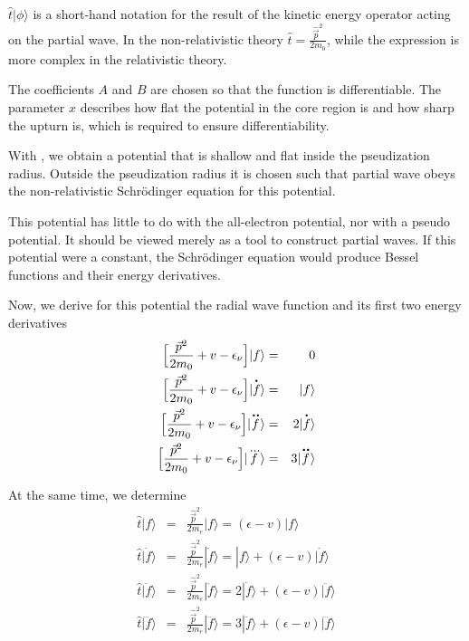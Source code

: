 \documentclass[11pt,a4paper]{report}
\begin{document}
$\hat{t}|\phi\rangle$ is a short-hand notation for the
result of the kinetic energy operator acting on the partial wave. In
the non-relativistic theory $\hat{t}=\frac{\hat{\vec{p}}^2}{2m_0}$,
while the expression is more complex in the relativistic theory.

The coefficients $A$ and $B$
are chosen so that the function is differentiable. The parameter $x$
describes how flat the potential in the core region is and how sharp
the upturn is, which is required to ensure differentiability.

With , we obtain a potential that is shallow and
flat inside the pseudization radius. Outside the pseudization radius
it is chosen such that partial wave obeys the non-relativistic
Schr\"odinger equation for this potential.

This potential has little to do with the all-electron potential,
nor with a pseudo potential. It should be viewed merely as a tool to
construct partial waves. If this potential were a constant, the
Schr\"odinger equation would produce Bessel functions and their
energy derivatives. 

Now, we derive for this potential the radial wave function and its
first two energy derivatives
\begin{eqnarray}
\Bigl[\frac{\vec{p}^2}{2m_0}+v-\epsilon_\nu\Bigr]|f\rangle&=&0
\nonumber\\
\Bigl[\frac{\vec{p}^2}{2m_0}+v-\epsilon_\nu\Bigr]|\dot{f}\rangle&=&|f\rangle
\nonumber\\
\Bigl[\frac{\vec{p}^2}{2m_0}+v-\epsilon_\nu\Bigr]|\ddot{f}\rangle
&=&2|\dot{f}\rangle
\nonumber\\
\Bigl[\frac{\vec{p}^2}{2m_0}+v-\epsilon_\nu\Bigr]|\dddot{f}\rangle
&=&3|\ddot{f}\rangle
\end{eqnarray}

At the same time, we determine 
\begin{eqnarray}
\hat{t}|f\rangle&=&\frac{\hat{\vec{p}}^2}{2m_e}|f\rangle
=(\epsilon-v)|f\rangle
\nonumber\\
\hat{t}|\dot{f}\rangle&=&\frac{\hat{\vec{p}}^2}{2m_e}|\dot{f}\rangle
=|f\rangle+(\epsilon-v)|\dot{f}\rangle
\nonumber\\
\hat{t}|\ddot{f}\rangle&=&\frac{\hat{\vec{p}}^2}{2m_e}|\ddot{f}\rangle
=2|\dot{f}\rangle+(\epsilon-v)|\ddot{f}\rangle
\nonumber\\
\hat{t}|\dddot{f}\rangle&=&\frac{\hat{\vec{p}}^2}{2m_e}|\dddot{f}\rangle
=3|\ddot{f}\rangle+(\epsilon-v)|\dddot{f}\rangle
\end{eqnarray}
\end{document}
